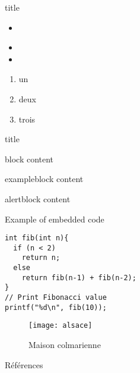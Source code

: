 


\frame[plain]{\titlepage} 
	
\begin{frame}{title}
\begin{itemize}
	\item {}\cite{Feynman1941}
	\item {}
	\item {}
\end{itemize}
\begin{enumerate}
	\item un
	\item deux
	\item trois
\end{enumerate}
\end{frame}

\begin{frame}{title}
\begin{block}{block}
	content
\end{block}
\begin{exampleblock}{exampleblock}
content
\end{exampleblock}
\begin{alertblock}{alertblock}
content
\end{alertblock}
\end{frame}

\begin{frame}[fragile]{Example of embedded code}
\begin{lstlisting}[style=customc]
int fib(int n){
  if (n < 2)
    return n;
  else
    return fib(n-1) + fib(n-2);
}
// Print Fibonacci value
printf("%d\n", fib(10));
\end{lstlisting}
\end{frame}

\begin{frame}{}
\begin{figure}[htbp]
\centering
\texttt{[image: alsace]}
\caption{Maison colmarienne}
\end{figure}
\end{frame}

\begin{frame}{Références}
\printbibliography
\end{frame}
